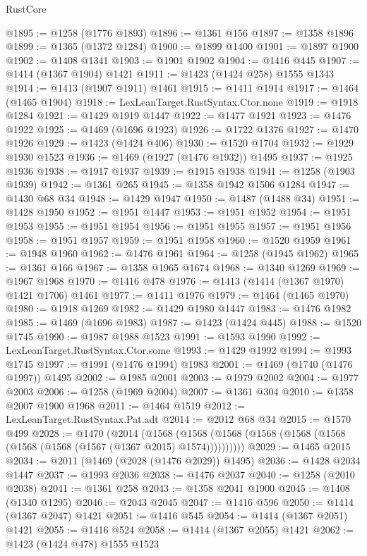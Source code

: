 \begin{lexlean}{RustCore}
\begin{coremodule}
@1895 := @1258 (@1776 @1893)
@1896 := @1361 @156
@1897 := @1358 @1896
@1899 := @1365 (@1372 @1284)
@1900 := @1899 @1400
@1901 := @1897 @1900
@1902 := @1408 @1341
@1903 := @1901 @1902
@1904 := @1416 @445
@1907 := @1414 (@1367 @1904) @1421
@1911 := @1423 (@1424 @258) @1555 @1343
@1914 := @1413 (@1907 @1911) @1461
@1915 := @1411 @1914
@1917 := @1464 (@1465 @1904)
@1918 := LexLeanTarget.RustSyntax.Ctor.none
@1919 := @1918 @1284
@1921 := @1429 @1919 @1447
@1922 := @1477 @1921
@1923 := @1476 @1922
@1925 := @1469 (@1696 @1923)
@1926 := @1722 @1376
@1927 := @1470 @1926
@1929 := @1423 (@1424 @406)
@1930 := @1520 @1704
@1932 := @1929 @1930 @1523
@1936 := @1469 (@1927 (@1476 @1932)) @1495
@1937 := @1925 @1936
@1938 := @1917 @1937
@1939 := @1915 @1938
@1941 := @1258 (@1903 @1939)
@1942 := @1361 @265
@1945 := @1358 @1942 @1506 @1284
@1947 := @1430 @68 @34
@1948 := @1429 @1947
@1950 := @1487 (@1488 @34)
@1951 := @1428 @1950
@1952 := @1951 @1447
@1953 := @1951 @1952
@1954 := @1951 @1953
@1955 := @1951 @1954
@1956 := @1951 @1955
@1957 := @1951 @1956
@1958 := @1951 @1957
@1959 := @1951 @1958
@1960 := @1520 @1959
@1961 := @1948 @1960
@1962 := @1476 @1961
@1964 := @1258 (@1945 @1962)
@1965 := @1361 @166
@1967 := @1358 @1965 @1674
@1968 := @1340 @1269
@1969 := @1967 @1968
@1970 := @1416 @478
@1976 := @1413 (@1414 (@1367 @1970) @1421 @1706) @1461
@1977 := @1411 @1976
@1979 := @1464 (@1465 @1970)
@1980 := @1918 @1269
@1982 := @1429 @1980 @1447
@1983 := @1476 @1982
@1985 := @1469 (@1696 @1983)
@1987 := @1423 (@1424 @445)
@1988 := @1520 @1745
@1990 := @1987 @1988 @1523
@1991 := @1593 @1990
@1992 := LexLeanTarget.RustSyntax.Ctor.some
@1993 := @1429 @1992
@1994 := @1993 @1745
@1997 := @1991 (@1476 @1994) @1983
@2001 := @1469 (@1740 (@1476 @1997)) @1495
@2002 := @1985 @2001
@2003 := @1979 @2002
@2004 := @1977 @2003
@2006 := @1258 (@1969 @2004)
@2007 := @1361 @304
@2010 := @1358 @2007 @1900 @1968
@2011 := @1464 @1519
@2012 := LexLeanTarget.RustSyntax.Pat.adt
@2014 := @2012 @68 @34
@2015 := @1570 @499
@2028 := @1470
    (@2014
      (@1568 (@1568 (@1568 (@1568 (@1568 (@1568 (@1568 (@1568 (@1567 (@1367 @2015) @1574))))))))))
@2029 := @1465 @2015
@2034 := @2011 (@1469 (@2028 (@1476 @2029)) @1495)
@2036 := @1428 @2034 @1447
@2037 := @1993 @2036
@2038 := @1476 @2037
@2040 := @1258 (@2010 @2038)
@2041 := @1361 @258
@2043 := @1358 @2041 @1900
@2045 := @1408 (@1340 @1295)
@2046 := @2043 @2045
@2047 := @1416 @596
@2050 := @1414 (@1367 @2047) @1421
@2051 := @1416 @545
@2054 := @1414 (@1367 @2051) @1421
@2055 := @1416 @524
@2058 := @1414 (@1367 @2055) @1421
@2062 := @1423 (@1424 @478) @1555 @1523

\end{coremodule}
\end{lexlean}
